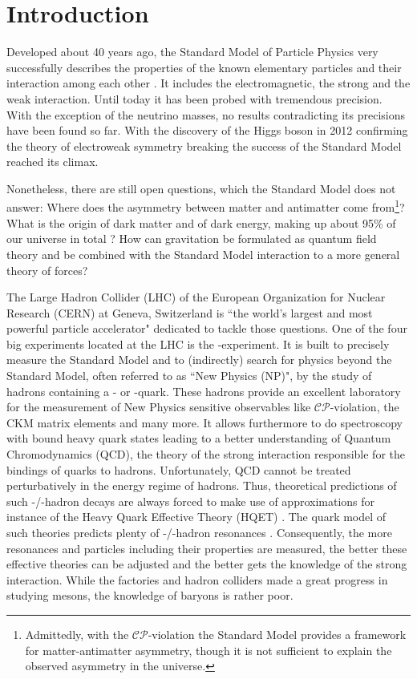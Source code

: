 \chapter{Introduction}
\label{sec:Introduction}
Developed about 40 years ago, the Standard Model of Particle Physics very successfully describes the properties of the known elementary particles and their interaction among each other \cite{SM_Glashow, SM_Salam, SM_Weinberg}.
It includes the electromagnetic, the strong and the weak interaction.
Until today it has been probed with tremendous precision.
With the exception of the neutrino masses, no results contradicting its precisions have been found so far.
With the discovery of the Higgs boson in 2012 \cite{Higgs_ATLAS, Higgs_CMS} confirming the theory of electroweak symmetry breaking the success of the Standard Model reached its climax.

Nonetheless, there are still open questions, which the Standard Model does not answer:
Where does the asymmetry between matter and antimatter come from\footnote{Admittedly, with the $\mathcal{CP}$-violation the Standard Model provides a framework for matter-antimatter asymmetry, though it is not sufficient to explain the observed asymmetry in the universe.}?
What is the origin of dark matter and of dark energy, making up about 95\% of our universe in total \cite{Planck_Universe}?
How can gravitation be formulated as quantum field theory and be combined with the Standard Model interaction to a more general theory of forces?

The Large Hadron Collider (LHC) of the European Organization for Nuclear Research (CERN) at Geneva, Switzerland is ``the world's largest and most powerful particle accelerator" \cite{CERN_LHC_web} dedicated to tackle those questions.
One of the four big experiments located at the LHC is the \lhcb-experiment.
It is built to precisely measure the Standard Model and to (indirectly) search for physics beyond the Standard Model, often referred to as ``New Physics (NP)", by the study of hadrons containing a \bquark- or \cquark-quark.
These hadrons provide an excellent laboratory for the measurement of New Physics sensitive observables like $\mathcal{CP}$-violation, the CKM matrix elements and many more.
It allows furthermore to do spectroscopy with bound heavy quark states leading to a better understanding of Quantum Chromodynamics (QCD), the theory of the strong interaction responsible for the bindings of quarks to hadrons.
Unfortunately, QCD cannot be treated perturbatively in the energy regime of hadrons.
Thus, theoretical predictions of such \bquark-/\cquark-hadron decays are always forced to make use of approximations for instance of the Heavy Quark Effective Theory (HQET) \cite{HQET_Introduction}.
The quark model of such theories predicts plenty of \bquark-/\cquark-hadron resonances \cite{cBaryons_Predictions}.
Consequently, the more resonances and particles including their properties are measured, the better these effective theories can be adjusted and the better gets the knowledge of the strong interaction.
While the \B factories and hadron colliders made a great progress in studying \bquark mesons, the knowledge of \bquark baryons is rather poor.

